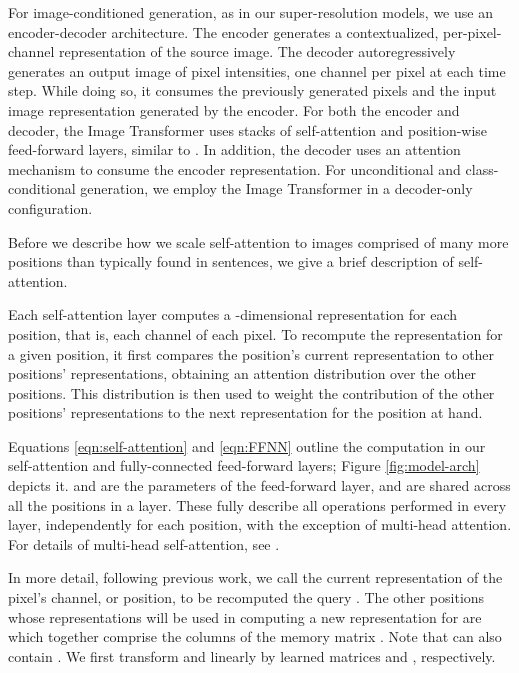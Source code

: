 \documentclass{article}
\begin{document}
For image-conditioned generation, as in our super-resolution models, we use an encoder-decoder architecture. The encoder generates a contextualized, per-pixel-channel representation of the source image.
The decoder autoregressively generates an output image of pixel intensities, one channel per pixel at each time step. While doing so, it consumes the previously generated pixels and the input image representation generated by the encoder. For both the encoder and decoder, the Image Transformer uses stacks of self-attention and position-wise feed-forward layers, similar to \citep{aiayn}. In addition, the decoder uses an attention mechanism to consume the encoder representation. For unconditional and class-conditional generation, we employ the Image Transformer in a decoder-only configuration.

Before we describe how we scale self-attention to images comprised of many more positions than typically found in sentences, we give a brief description of self-attention.



Each self-attention layer computes a -dimensional representation for each position, that is, each channel of each pixel. To recompute the representation for a given position, it first compares the position's current representation to other positions' representations, obtaining an attention distribution over the other positions. This distribution is then used to weight the contribution of the other positions' representations to the next representation for the position at hand.


Equations \ref{eqn:self-attention} and \ref{eqn:FFNN} outline the computation in our self-attention and fully-connected feed-forward layers; Figure \ref{fig:model-arch} depicts it.  and  are the parameters of the feed-forward layer, and are shared across all the positions in a layer.  These fully describe all operations performed in every layer, independently for each position, with the exception of multi-head attention. For details of multi-head self-attention, see \citep{aiayn}.










In more detail, following previous work, we call the current representation of the pixel's channel, or position, to be recomputed the query . The other positions whose representations will be used in computing a new representation for  are  which together comprise the columns of the memory matrix .
Note that  can also contain . We first transform  and  linearly by learned matrices  and , respectively.
\end{document}
